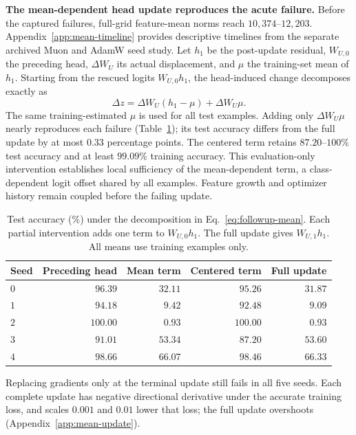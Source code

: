 \documentclass{article}
\begin{document}
\textbf{The mean-dependent head update reproduces the acute failure.} Before the captured failures, full-grid feature-mean norms reach $10{,}374$--$12{,}203$. Appendix~\ref{app:mean-timeline} provides descriptive timelines from the separate archived Muon and AdamW seed study. Let $h_1$ be the post-update residual, $W_{U,0}$ the preceding head, $\Delta W_U$ its actual displacement, and $\mu$ the training-set mean of $h_1$. Starting from the rescued logits $W_{U,0}h_1$, the head-induced change decomposes exactly as
\begin{equation}
\Delta z=\Delta W_U(h_1-\mu)+\Delta W_U\mu.
\label{eq:followup-mean}
\end{equation}
The same training-estimated $\mu$ is used for all test examples. Adding only $\Delta W_U\mu$ nearly reproduces each failure (Table~\ref{tab:mean-update}); its test accuracy differs from the full update by at most $0.33$ percentage points. The centered term retains $87.20$--$100\%$ test accuracy and at least $99.09\%$ training accuracy. This evaluation-only intervention establishes local sufficiency of the mean-dependent term, a class-dependent logit offset shared by all examples. Feature growth and optimizer history remain coupled before the failing update.

\begin{table}[!htbp]
\centering\small
\caption{Test accuracy (\%) under the decomposition in Eq.~\ref{eq:followup-mean}. Each partial intervention adds one term to $W_{U,0}h_1$. The full update gives $W_{U,1}h_1$. All means use training examples only.}
\label{tab:mean-update}
\begin{tabular}{lrrrr}
\toprule
Seed & Preceding head & Mean term & Centered term & Full update \\
\midrule
$0$ & $96.39$ & $32.11$ & $95.26$ & $31.87$ \\
$1$ & $94.18$ & $9.42$ & $92.48$ & $9.09$ \\
$2$ & $100.00$ & $0.93$ & $100.00$ & $0.93$ \\
$3$ & $91.01$ & $53.34$ & $87.20$ & $53.60$ \\
$4$ & $98.66$ & $66.07$ & $98.46$ & $66.33$ \\
\bottomrule
\end{tabular}
\end{table}

Replacing gradients only at the terminal update still fails in all five seeds. Each complete update has negative directional derivative under the accurate training loss, and scales $0.001$ and $0.01$ lower that loss; the full update overshoots (Appendix~\ref{app:mean-update}).
\end{document}
